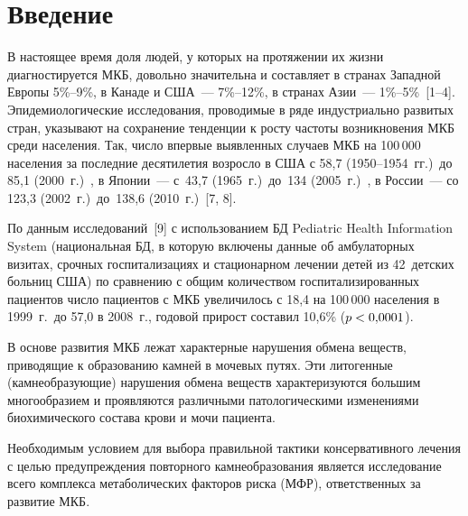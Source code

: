 


      \thispagestyle{headings}

      \begin{multicols}{2}

            \label{st\stat}

\section{Введение}

      В настоящее время доля людей, у которых на протяжении их жизни диагностируется 
МКБ, довольно значительна и составляет в странах Западной Европы 5\%--9\%, в Канаде и 
США~--- 7\%--12\%, в странах Азии~--- 1\%--5\%~[1--4]. 
      Эпидемиологические исследования, проводимые в ряде индустриально развитых стран, 
указывают на сохранение тенденции к росту частоты возникновения МКБ 
среди населения. Так, число  впервые выявленных случаев
МКБ на 100\,000 населения за последние 
десятилетия возросло в США с 58,7 (1950--1954~гг.)\ до 85,1 (2000~г.)~\cite{4-su, 3-su}, 
в Японии~--- с~43,7 
(1965~г.)\ до~134 (2005~г.)~\cite{6-su, 5-su}, в России~--- со 123,3 (2002~г.)\ до~138,6 
(2010~г.)~[7, 8].
      
      По данным исследований~[9] с использованием БД Pediatric Health 
Information System (национальная БД, в которую включены данные об амбулаторных 
визитах, срочных госпитализациях и стационарном лечении детей из 42~детских больниц 
США) по сравнению с общим количеством госпитализированных пациентов число пациентов 
с МКБ увеличилось с 18,4 на 100\,000 населения в 1999~г.\ до 57,0 в 2008~г., годовой прирост 
составил 10,6\% ($p \hm<0{,}0001$). 
      
      В основе развития МКБ лежат характерные нарушения обмена веществ, приводящие к 
образованию камней в мочевых путях. Эти литогенные (камнеобразующие) нарушения обмена 
веществ характеризуются большим многообразием и проявляются различными 
патологическими изменениями биохимического состава крови и мочи пациента.
      
      Необходимым условием для выбора правильной тактики консервативного лечения с 
целью предупреждения повторного камнеобразования является исследование всего комплекса 
метаболических факторов риска (МФР), ответственных за развитие МКБ.
{

}
\end{multicols}
